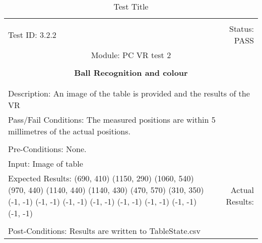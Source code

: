 \documentclass[titlepage]{article}
\begin{document}
\begin{center}%
\begin{table}[h!]
\begin{tabular}{|l r|}\hline&\\[-2mm]
	Test ID: 3.2.2	&Status: PASS\\[-3mm]
	\multicolumn{2}{|c|}{Module: PC VR test 2}\\&\\
	\multicolumn{2}{|c|}{\textbf{\large{Ball Recognition and colour}}}\\&\\\hline&\\[-3mm]
	\multicolumn{2}{|p{\textwidth}|}{Description: An image of the table is provided and the results of the VR }\\\hline
	\multicolumn{2}{|p{\textwidth}|}{Pass/Fail Conditions: The measured positions are within 5 millimetres of the actual positions.}\\[1mm]\hline&\\[-3mm]
	\multicolumn{2}{|p{\textwidth}|}{Pre-Conditions: None.}\\[4mm]
	\multicolumn{2}{|p{\textwidth}|}{Input: Image of table}\\[2mm]\hline
	\multicolumn{1}{|p{0.49\textwidth}}{Expected Results:\newline
(690, 410)\newline
(1150, 290)\newline
(1060, 540)\newline
(970, 440)\newline
(1140, 440)\newline
(1140, 430)\newline
(470, 570)\newline
(310, 350)\newline
(-1, -1)\newline
(-1, -1)\newline
(-1, -1)\newline
(-1, -1)\newline
(-1, -1)\newline
(-1, -1)\newline
(-1, -1)\newline
(-1, -1)\newline}	&\multicolumn{1}{|p{0.45\textwidth}|}{Actual Results:}\\\hline&\\[-3mm]
	\multicolumn{2}{|p{\textwidth}|}{Post-Conditions: Results are written to TableState.csv}\\\hline
\end{tabular}
\caption{Test Title}
\end{table}
\end{center}
\newpage
\end{document}
